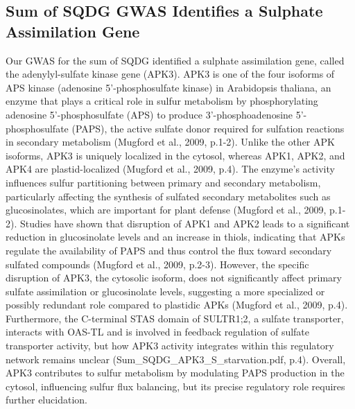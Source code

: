 \documentclass[10pt,letterpaper]{article}
\begin{document}
\subsection*{Sum of SQDG GWAS Identifies a Sulphate Assimilation Gene}
Our GWAS for the sum of SQDG identified a sulphate assimilation gene, called the adenylyl-sulfate kinase gene (APK3). APK3 is one of the four isoforms of APS kinase (adenosine 5'-phosphosulfate kinase) in Arabidopsis thaliana, an enzyme that plays a critical role in sulfur metabolism by phosphorylating adenosine 5'-phosphosulfate (APS) to produce 3'-phosphoadenosine 5'-phosphosulfate (PAPS), the active sulfate donor required for sulfation reactions in secondary metabolism (Mugford et al., 2009, p.1-2). Unlike the other APK isoforms, APK3 is uniquely localized in the cytosol, whereas APK1, APK2, and APK4 are plastid-localized (Mugford et al., 2009, p.4). The enzyme's activity influences sulfur partitioning between primary and secondary metabolism, particularly affecting the synthesis of sulfated secondary metabolites such as glucosinolates, which are important for plant defense (Mugford et al., 2009, p.1-2). Studies have shown that disruption of APK1 and APK2 leads to a significant reduction in glucosinolate levels and an increase in thiols, indicating that APKs regulate the availability of PAPS and thus control the flux toward secondary sulfated compounds (Mugford et al., 2009, p.2-3). However, the specific disruption of APK3, the cytosolic isoform, does not significantly affect primary sulfate assimilation or glucosinolate levels, suggesting a more specialized or possibly redundant role compared to plastidic APKs (Mugford et al., 2009, p.4). Furthermore, the C-terminal STAS domain of SULTR1;2, a sulfate transporter, interacts with OAS-TL and is involved in feedback regulation of sulfate transporter activity, but how APK3 activity integrates within this regulatory network remains unclear (Sum\_SQDG\_APK3\_S\_starvation.pdf, p.4). Overall, APK3 contributes to sulfur metabolism by modulating PAPS production in the cytosol, influencing sulfur flux balancing, but its precise regulatory role requires further elucidation.


\end{document}
